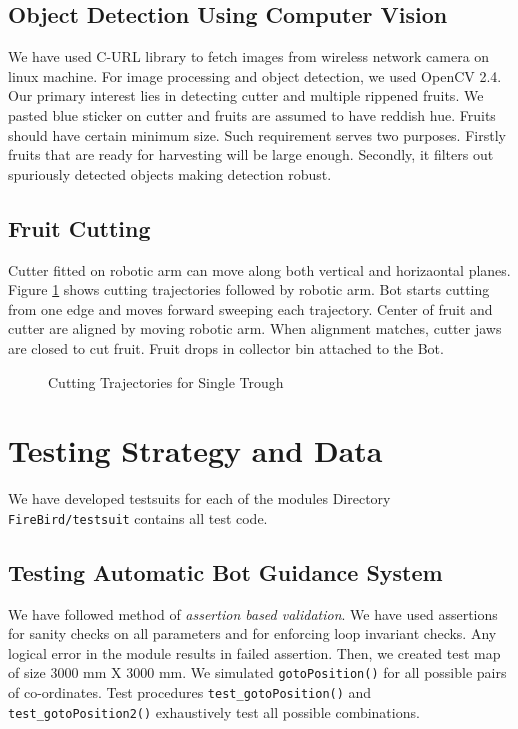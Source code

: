 \documentclass[a4paper, 12pt]{article}
\begin{document}
\subsection{Object Detection Using Computer Vision}
We have used C-URL library to fetch images from wireless network camera on linux machine. For image
processing and object detection, we used OpenCV 2.4. Our primary interest lies in detecting cutter and multiple 
rippened fruits. We pasted blue sticker on cutter and fruits are assumed to have reddish hue. Fruits should
have certain minimum size. Such requirement serves two purposes. Firstly fruits that are ready for harvesting
will be large enough. Secondly, it filters out spuriously detected objects making detection robust.

\subsection{Fruit Cutting}
Cutter fitted on robotic arm can move along both vertical and horizaontal planes. Figure \ref{fig-traj} shows
cutting trajectories followed by robotic arm. Bot starts cutting from one edge and moves forward sweeping
each trajectory. Center of fruit and cutter are aligned by moving robotic arm. When alignment matches,
cutter jaws are closed to cut fruit. Fruit drops in collector bin attached to the Bot. 

\begin{figure}
 
 \caption{Cutting Trajectories for Single Trough}
 \label{fig-traj}
\end{figure}


\section{Testing Strategy and Data}
 We have developed testsuits for each of the modules Directory \texttt{FireBird/testsuit} contains all test code.
 \subsection{Testing Automatic Bot Guidance System}
 We have followed method of \emph{assertion based validation}. We have used assertions for sanity checks on all
 parameters and for enforcing loop invariant checks. Any logical error in the module results in failed assertion. 
 Then, we created test map of size 3000 mm X 3000 mm. We simulated \texttt{gotoPosition()} for all possible pairs
 of co-ordinates. Test procedures \texttt{test\_gotoPosition()} and \texttt{test\_gotoPosition2()} exhaustively 
 test all possible combinations.
 
\end{document}
